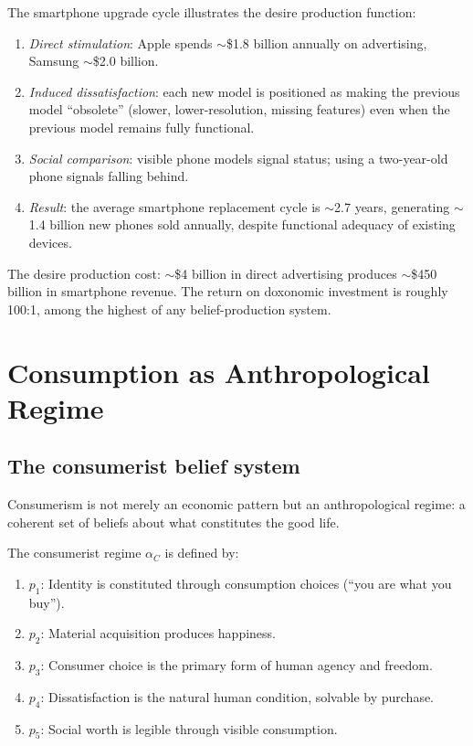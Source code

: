 \begin{example}
\label{ex:smartphone}
The smartphone upgrade cycle illustrates the desire production function:
\begin{enumerate}[nosep]
  \item \emph{Direct stimulation}: Apple spends $\sim$\$1.8 billion annually on advertising, Samsung $\sim$\$2.0 billion.
  \item \emph{Induced dissatisfaction}: each new model is positioned as making the previous model ``obsolete'' (slower, lower-resolution, missing features) even when the previous model remains fully functional.
  \item \emph{Social comparison}: visible phone models signal status; using a two-year-old phone signals falling behind.
  \item \emph{Result}: the average smartphone replacement cycle is $\sim$2.7 years, generating $\sim$1.4 billion new phones sold annually, despite functional adequacy of existing devices.
\end{enumerate}
The desire production cost: $\sim$\$4 billion in direct advertising produces $\sim$\$450 billion in smartphone revenue.
The return on doxonomic investment is roughly 100:1, among the highest of any belief-production system.
\end{example}

\section{Consumption as Anthropological Regime}
\label{sec:ch23-moral}

\subsection{The consumerist belief system}

Consumerism is not merely an economic pattern but an anthropological regime: a coherent set of beliefs about what constitutes the good life.

\begin{definition}
\label{def:consumerist-regime}
The consumerist regime $\alpha_C$ is defined by:
\begin{enumerate}[nosep]
  \item $p_1$: Identity is constituted through consumption choices (``you are what you buy'').
  \item $p_2$: Material acquisition produces happiness.
  \item $p_3$: Consumer choice is the primary form of human agency and freedom.
  \item $p_4$: Dissatisfaction is the natural human condition, solvable by purchase.
  \item $p_5$: Social worth is legible through visible consumption.
\end{enumerate}
\end{definition}

